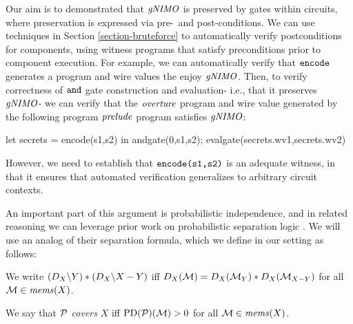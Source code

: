 Our aim is to demonstrated that $\mathit{gNIMO}$ is preserved by gates within circuits,
where preservation is expressed via pre-~and post-conditions. We can use
techniques in Section \ref{section-bruteforce} to automatically verify postconditions
for components, using witness programs that satisfy preconditions prior to
component execution. For example, we can automatically verify that $\texttt{encode}$
generates a program and wire values the enjoy $\mathit{gNIMO}$. Then, to verify
correctness of $\texttt{and}$ gate construction and evaluation- i.e., that it
preserves $\mathit{gNIMO}$- we can verify
that the $\mathit{overture}$ program and wire value generated by the following program
$\mathit{prelude}$ program satisfies $\mathit{gNIMO}$:
\begin{verbatimtab}
  let secrets = encode(s1,s2) in
  andgate(0,s1,s2); evalgate(secrets.wv1,secrets.wv2)
\end{verbatimtab}
However, we need to establish that $\texttt{encode(s1,s2)}$ is an
adequate witness, in that it ensures that automated verification generalizes to
arbitrary circuit contexts. 
  
An important part of this argument is probabilistic independence,
and in related reasoning we can leverage prior work on probabilistic
separation logic \cite{barthe2019probabilistic}. We will use an
analog of their separation formula, which we define in our setting as follows:
\begin{definition}
  We write $(D_{X}\backslash Y) * (D_{X}\backslash X-Y)$ iff
  $D_{X}(\mathcal{M}) = D_{X}(\mathcal{M}_{Y}) * D_{X}(\mathcal{M}_{X-Y})$
  for all $\mathcal{M} \in \mathit{mems}(X)$.
\end{definition}

\begin{definition}
  We say that $\mathcal{P}$ \emph{covers} $X$ iff
  $\mathrm{PD}(\mathcal{P})(\mathcal{M}) > 0$ for all $\mathcal{M}\in\mathit{mems}(X)$.
\end{definition}

